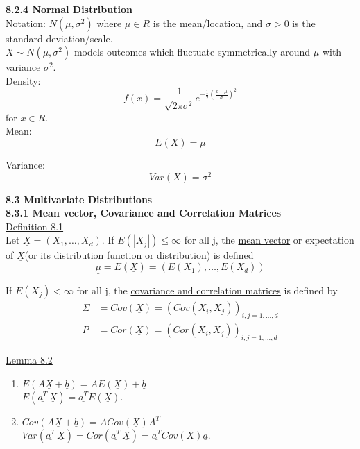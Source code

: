\documentclass[10pt,letterpaper]{article}
\begin{document}
\textbf{8.2.4 Normal Distribution}\\

						Notation: $N(\mu, \sigma^2)$ where $\mu\in R$ is the mean/location, and $\sigma>0$ is the standard deviation/scale.\\
						
						$X\sim N(\mu, \sigma^2)$ models outcomes which fluctuate symmetrically around $\mu$ with variance $\sigma^2$.\\
						
						Density: \[f(x)=\frac{1}{\sqrt{2\pi\sigma^2}}e^{-\frac{1}{2}(\frac{x-\mu}{\sigma})^2}\] for $x\in R$.\\
						
						Mean:
							$$E(X)=\mu$$
						
						Variance:
							$$Var(X)=\sigma^2$$

\pagebreak

\textbf{8.3 Multivariate Distributions}\\

\textbf{8.3.1 Mean vector, Covariance and Correlation Matrices}\\

\underline{Definition 8.1}\\

				Let $\underline{X}=(X_1, \dots, X_d)$. If $E(|X_j|)\leq\infty$ for all j, the \underline{mean vector} or expectation of $\underline{X}$(or its distribution function or distribution) is defined $$\underline{\mu}=E(\underline{X})=(E(X_1), \dots, E(X_d))$$
				
				If $E(X_j)<\infty$ for all j, the \underline{covariance and correlation matrices} is defined by
				\begin{align*}
					\Sigma&=Cov(\underline{X})=(Cov(X_i, X_j))_{i, j=1, \dots, d}\\
					P&=Cor(\underline{X})=(Cor(X_i, X_j))_{i, j=1, \dots, d}
				\end{align*}

\underline{Lemma 8.2}\\

\begin{enumerate}
					\item $E(A\underline{X}+\underline{b})=AE(\underline{X})+\underline{b}$\\
					$E(\underline{a^T}\,\underline{X})=\underline{a^T}E(\underline{X})$.
					
					\item $Cov(A\underline{X}+\underline{b})=A Cov(\underline{X})A^T$\\
					$Var(\underline{a^T}\,\underline{X})=Cor(\underline{a^T}\,\underline{X})=\underline{a^T}Cov(X)\underline{a}$.
\end{enumerate}
\end{document}

